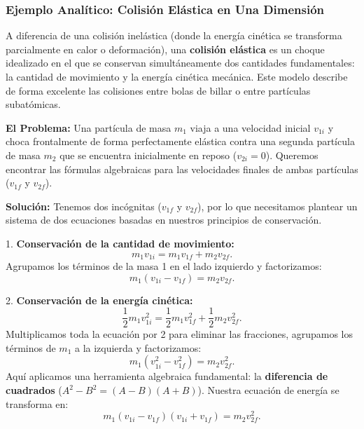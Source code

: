 \documentclass[11pt,a4paper]{book}
\begin{document}
\subsubsection{Ejemplo Analítico: Colisión Elástica en Una Dimensión}

A diferencia de una colisión inelástica (donde la energía cinética se transforma parcialmente en calor o deformación), una \textbf{colisión elástica} es un choque idealizado en el que se conservan simultáneamente dos cantidades fundamentales: la cantidad de movimiento y la energía cinética mecánica. Este modelo describe de forma excelente las colisiones entre bolas de billar o entre partículas subatómicas.

\textbf{El Problema:} Una partícula de masa $m_1$ viaja a una velocidad inicial $v_{1i}$ y choca frontalmente de forma perfectamente elástica contra una segunda partícula de masa $m_2$ que se encuentra inicialmente en reposo ($v_{2i} = 0$). Queremos encontrar las fórmulas algebraicas para las velocidades finales de ambas partículas ($v_{1f}$ y $v_{2f}$).

\textbf{Solución:}
Tenemos dos incógnitas ($v_{1f}$ y $v_{2f}$), por lo que necesitamos plantear un sistema de dos ecuaciones basadas en nuestros principios de conservación.

1. \textbf{Conservación de la cantidad de movimiento:}
\begin{equation}
    m_1 v_{1i} = m_1 v_{1f} + m_2 v_{2f}.
\end{equation}
Agrupamos los términos de la masa 1 en el lado izquierdo y factorizamos:
\begin{equation}
    m_1 (v_{1i} - v_{1f}) = m_2 v_{2f}.
    \label{eq:momento_elastico}
\end{equation}

2. \textbf{Conservación de la energía cinética:}
\begin{equation}
    \frac{1}{2}m_1 v_{1i}^2 = \frac{1}{2}m_1 v_{1f}^2 + \frac{1}{2}m_2 v_{2f}^2.
\end{equation}
Multiplicamos toda la ecuación por 2 para eliminar las fracciones, agrupamos los términos de $m_1$ a la izquierda y factorizamos:
\begin{equation}
    m_1 (v_{1i}^2 - v_{1f}^2) = m_2 v_{2f}^2.
\end{equation}
Aquí aplicamos una herramienta algebraica fundamental: la \textbf{diferencia de cuadrados} ($A^2 - B^2 = (A-B)(A+B)$). Nuestra ecuación de energía se transforma en:
\begin{equation}
    m_1 (v_{1i} - v_{1f})(v_{1i} + v_{1f}) = m_2 v_{2f}^2.
    \label{eq:energia_elastica}
\end{equation}
\end{document}
